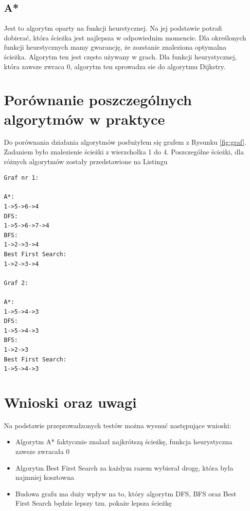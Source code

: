 \documentclass[10pt,a4paper]{article}
\begin{document}
\subsection{A*}
Jest to algorytm oparty na funkcji heurstycznej. Na jej podstawie
potrafi dobierać, która ścieżka jest najlepsza w odpowiednim momencie. Dla określonych funkcji heurstycznych mamy gwarancję, że
zozstanie znaleziona optymalna ścieżka. Algorytm ten jest często 
używany w grach. Dla funkcji heurystycznej, która zawsze zwraca 0,
algorytm ten sprowadza sie do algorytmu Dijkstry.

\section{Porównanie poszczególnych algorytmów w praktyce}

Do porównania działania algorytmów posłużyłem się grafem z Rysunku \ref{fig:graf}.
Zadaniem było znalezienie ścieżki z wierzchołka 1 do 4.
Poszczególne ścieżki, dla różnych algorytmów zostały przedstawione
na Listingu

\begin{lstlisting}[caption={Wyniki poszukiwania ścieżek dla poszczególnych algorytmów}]
Graf nr 1:

A*:
1->5->6->4
DFS:
1->5->6->7->4
BFS:
1->2->3->4
Best First Search:
1->2->3->4

Graf 2:

A*:
1->5->4->3
DFS:
1->5->4->3
BFS:
1->2->3
Best First Search:
1->5->4->3
\end{lstlisting}

\section{Wnioski oraz uwagi}

Na podstawie przeprowadzonych testów można wysnuć następujące wnioski:
\begin{itemize}
\item Algorytm A* faktycznie znalazł najkrótszą ścieżkę, funkcja
heurystyczna zawsze zwracała 0
\item Algorytm Best First Search za każdym razem wybierał
drogę, która była najmniej kosztowna
\item Budowa grafu ma duży wpływ na to, który algorytm DFS, BFS oraz Best First Search będzie lepszy tzn. pokaże lepsza ścieżkę
\end{itemize}
\end{document}
